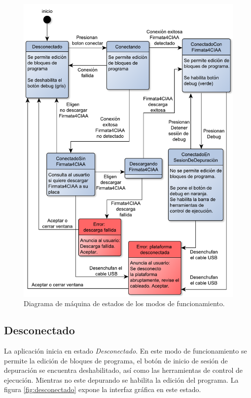 \begin{figure}[!htbp]
	\begin{center}  %
		\includegraphics*[width=15cm]{./Figures/diagrama-estados.pdf}
		\par\caption{Diagrama de máquina de estados de los modos de funcionamiento.}\label{fig:diagrama-estados}
	\end{center}
\end{figure}


\subsection{Desconectado}
\label{subsec:No Conectado}

La aplicación inicia en estado \emph{Desconectado}. En este modo de funcionamiento se permite la edición de bloques de programa, el botón de inicio de sesión de depuración se encuentra deshabilitado, así como las herramientas de control de ejecución. Mientras no este depurando se habilita la edición del programa. La figura \ref{fig:desconectado} expone la interfaz gráfica en este estado.


